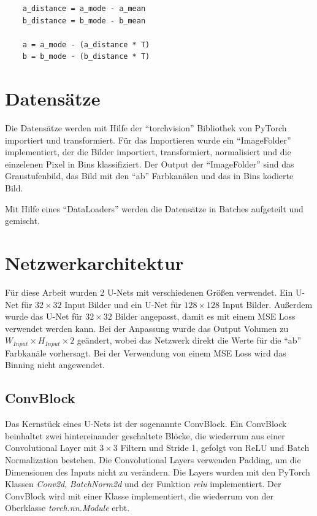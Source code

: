 \begin{listing}[H]
  \begin{verbatim}
    a_distance = a_mode - a_mean
    b_distance = b_mode - b_mean

    a = a_mode - (a_distance * T)
    b = b_mode - (b_distance * T)
  \end{verbatim}
\end{listing}

\section{Datensätze}
Die Datensätze werden mit Hilfe der ``torchvision'' Bibliothek von PyTorch importiert und transformiert. Für das Importieren wurde ein
``ImageFolder'' implementiert, der die Bilder importiert, transformiert, normalisiert und die einzelenen Pixel in Bins klassifiziert. 
Der Output der ``ImageFolder'' sind das Graustufenbild, das Bild mit den ``ab'' Farbkanälen und das in Bins kodierte Bild.

Mit Hilfe eines ``DataLoaders'' werden die Datensätze in Batches aufgeteilt und gemischt.

\section{Netzwerkarchitektur}
Für diese Arbeit wurden 2 U-Nets mit verschiedenen Größen verwendet. Ein U-Net für $ 32 \times 32 $ Input Bilder und ein U-Net für $ 128 \times 128 $ 
Input Bilder. Außerdem wurde das U-Net für $ 32 \times 32 $ Bilder angepasst, damit es mit einem MSE Loss verwendet werden kann. Bei der Anpassung wurde
das Output Volumen zu $ W_{Input} \times H_{Input} \times 2 $ geändert, wobei das Netzwerk direkt die Werte für die ``ab'' Farbkanäle vorhersagt.
Bei der Verwendung von einem MSE Loss wird das Binning nicht angewendet.
 
\subsection{ConvBlock}
Das Kernstück eines U-Nets ist der sogenannte ConvBlock. Ein ConvBlock beinhaltet zwei hintereinander geschaltete Blöcke, die wiederrum
aus einer Convolutional Layer mit $3 \times 3$ Filtern und Stride 1, gefolgt von ReLU und Batch Normalization bestehen. 
Die Convolutional Layers verwenden Padding, um die Dimensionen des Inputs nicht zu verändern. Die Layers wurden mit den PyTorch 
Klassen \textit{Conv2d}, \textit{BatchNorm2d} und der Funktion \textit{relu} implementiert. Der ConvBlock wird mit einer Klasse implementiert,
die wiederrum von der Oberklasse \textit{torch.nn.Module} erbt.


